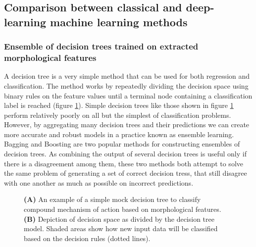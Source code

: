 \documentclass[a4paper,11pt,twoside,openright]{scrbook}
\begin{document}

\subsection{Comparison between classical and deep-learning machine learning methods}

\subsubsection{Ensemble of decision trees trained on extracted morphological features}
A decision tree is a very simple method that can be used for both regression and classification.
The method works by repeatedly dividing the decision space using binary rules on the feature values until a terminal node containing a classification label is reached (figure \ref{figure:decision_tree}).
Simple decision trees like those shown in figure \ref{figure:decision_tree} perform relatively poorly on all but the simplest of classification problems.
However, by aggregating many decision trees and their predictions we can create more accurate and robust models in a practice known as ensemble learning. \cite{Opitz1999}
Bagging \cite{Breiman1996} and Boosting \cite{Freund1996} are two popular methods for constructing ensembles of decision trees.
As combining the output of several decision trees is useful only if there is a disagreement among them, these two methods both attempt to solve the same problem of generating a set of correct decision tress, that still disagree with one another as much as possible on incorrect predictions.


\begin{figure}
    \captionsetup{width=0.8\textwidth}
    \caption[Diagram of a simple decision tree]{\textbf{(A)} An example of a simple mock decision tree to classify compound mechanism of action based on morphological features. \textbf{(B)} Depiction of decision space as divided by the decision tree model. Shaded areas show how new input data will be classified based on the decision rules (dotted lines).}
    
    \label{figure:decision_tree}
\end{figure}
\end{document}
